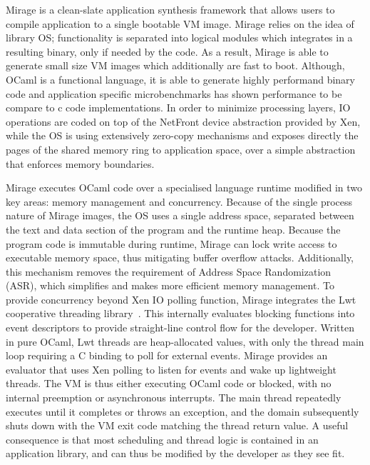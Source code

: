Mirage is a clean-slate application synthesis framework that allows users to
compile application to a single bootable VM image. Mirage relies on the idea of
library OS; functionality is separated into logical modules which integrates in
a resulting binary, only if needed by the code. As a result, Mirage is able to
generate small size VM images which additionally are fast to boot. Although, 
OCaml is a functional language, it is able to generate highly performand binary
code and application specific microbenchmarks has shown performance to be
compare to c code implementations. In order to
minimize processing layers, IO operations are coded on top of the NetFront
device abstraction provided by Xen, while the OS is using extensively zero-copy
mechanisms and exposes directly the pages of the shared memory ring to
application space, over a simple abstraction that enforces memory boundaries.

Mirage executes OCaml code over a specialised language runtime modiﬁed in two
key areas: memory management and concurrency. Because of the single process
nature of Mirage images, the OS uses a single address space, separated between
the text and data section of the program and the runtime heap. Because the
program code is immutable during runtime, Mirage can lock write access to
executable memory space, thus mitigating buffer overflow attacks. Additionally,
this mechanism removes the requirement of Address Space Randomization (ASR),
which simplifies and makes more efficient memory management.  To provide
concurrency beyond Xen IO polling function, Mirage integrates the Lwt
cooperative threading library~\cite{lwt}. This internally evaluates blocking
functions into event descriptors to provide straight-line control ﬂow for the
developer.  Written in pure OCaml, Lwt threads are heap-allocated values, with
only the thread main loop requiring a C binding to poll for external events.
Mirage provides an evaluator that uses Xen polling to listen for events and wake
up lightweight threads. The VM is thus either executing OCaml code or blocked,
with no internal preemption or asynchronous interrupts. The main thread
repeatedly executes until it completes or throws an exception, and the domain
subsequently shuts down with the VM exit code matching the thread return value.
A useful consequence is that most scheduling and thread logic is contained in an
application library, and can thus be modified by the developer as they see fit. 

